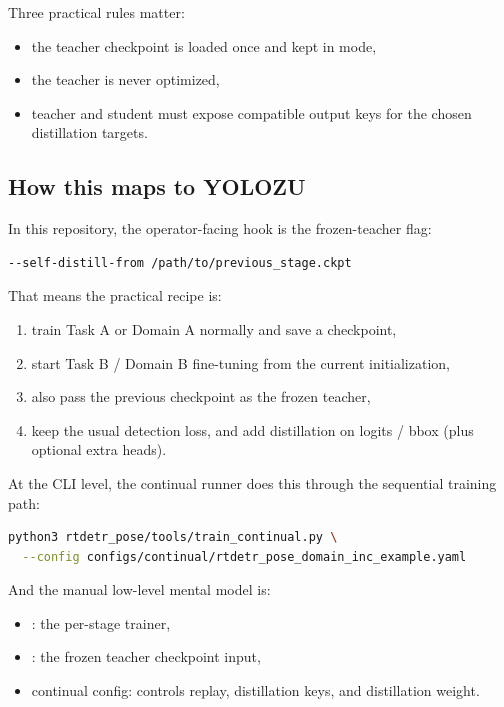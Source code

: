 Three practical rules matter:
\begin{itemize}
  \item the teacher checkpoint is loaded once and kept in  mode,
  \item the teacher is never optimized,
  \item teacher and student must expose compatible output keys for the chosen distillation targets.
\end{itemize}

\subsection{How this maps to YOLOZU}

In this repository, the operator-facing hook is the frozen-teacher flag:
\begin{lstlisting}[language=bash]
--self-distill-from /path/to/previous_stage.ckpt
\end{lstlisting}

That means the practical recipe is:
\begin{enumerate}
  \item train Task A or Domain A normally and save a checkpoint,
  \item start Task B / Domain B fine-tuning from the current initialization,
  \item also pass the previous checkpoint as the frozen teacher,
  \item keep the usual detection loss, and add distillation on logits / bbox (plus optional extra heads).
\end{enumerate}

At the CLI level, the continual runner does this through the sequential training path:
\begin{lstlisting}[language=bash]
python3 rtdetr_pose/tools/train_continual.py \
  --config configs/continual/rtdetr_pose_domain_inc_example.yaml
\end{lstlisting}

And the manual low-level mental model is:
\begin{itemize}
  \item {}: the per-stage trainer,
  \item {}: the frozen teacher checkpoint input,
  \item continual config: controls replay, distillation keys, and distillation weight.
\end{itemize}

